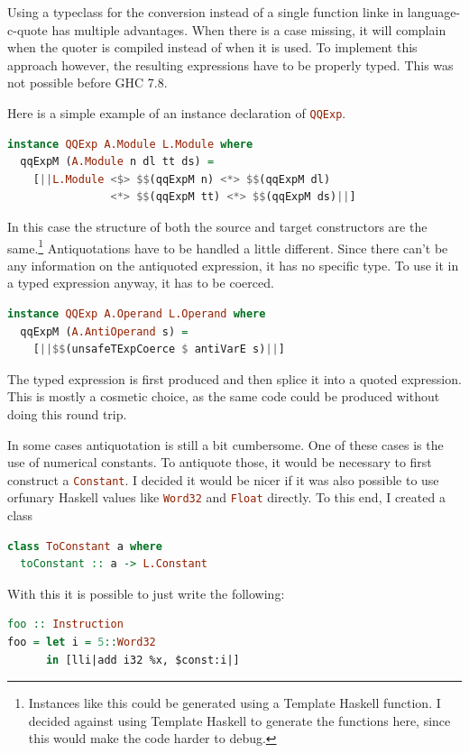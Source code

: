 \documentclass[a4paper,bibliography=totocnumbered,parskip,headsepline]{scrbook}
\begin{document}
Using a typeclass for the conversion instead of a single function linke in language-c-quote has multiple advantages.
When there is a case missing, it will complain when the quoter is compiled instead of when it is used.
To implement this approach however, the resulting expressions have to be properly typed.
This was not possible before GHC 7.8.

Here is a simple example of an instance declaration of \lstinline[language=haskell]!QQExp!.
\begin{lstlisting}[language=haskell]
instance QQExp A.Module L.Module where
  qqExpM (A.Module n dl tt ds) =
    [||L.Module <$> $$(qqExpM n) <*> $$(qqExpM dl)
                <*> $$(qqExpM tt) <*> $$(qqExpM ds)||]
\end{lstlisting}
In this case the structure of both the source and target constructors are the same.\footnote{Instances like this could be generated using a Template Haskell function.
I decided against using Template Haskell to generate the functions here, since this would make the code harder to debug.}
Antiquotations have to be handled a little different.
Since there can't be any information on the antiquoted expression, it has no specific type.
To use it in a typed expression anyway, it has to be coerced.
\begin{lstlisting}[language=haskell]
instance QQExp A.Operand L.Operand where
  qqExpM (A.AntiOperand s) =
    [||$$(unsafeTExpCoerce $ antiVarE s)||]
\end{lstlisting}
The typed expression is first produced and then splice it into a quoted expression.
This is mostly a cosmetic choice, as the same code could be produced without doing this round trip.

In some cases antiquotation is still a bit cumbersome.
One of these cases is the use of numerical constants.
To antiquote those, it would be necessary to first construct a \lstinline[language=haskell]!Constant!.
I decided it would be nicer if it was also possible to use orfunary Haskell values like \lstinline[language=haskell]!Word32! and \lstinline[language=haskell]!Float! directly.
To this end, I created a class
\begin{lstlisting}[language=haskell]
class ToConstant a where
  toConstant :: a -> L.Constant
\end{lstlisting}
With this it is possible to just write the following:
\begin{lstlisting}[language=haskell]
foo :: Instruction
foo = let i = 5::Word32
      in [lli|add i32 %x, $const:i|]
\end{lstlisting}
\end{document}
